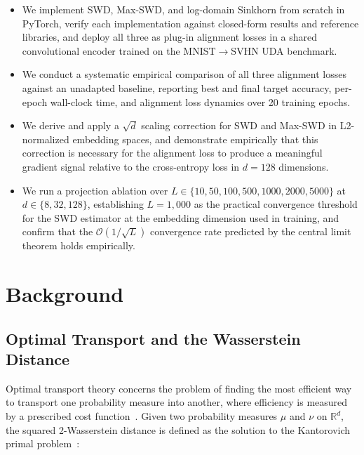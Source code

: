 \documentclass{article}
\begin{document}
	\begin{itemize}
		\item We implement SWD, Max-SWD, and log-domain Sinkhorn from scratch in PyTorch, verify each implementation against closed-form results and reference libraries, and deploy all three as plug-in alignment losses in a shared convolutional encoder trained on the MNIST$\to$SVHN UDA benchmark.
		
		\item We conduct a systematic empirical comparison of all three alignment losses against an unadapted baseline, reporting best and final target accuracy, per-epoch wall-clock time, and alignment loss dynamics over 20 training epochs.
		
		\item We derive and apply a $\sqrt{d}$ scaling correction for SWD and Max-SWD in L2-normalized embedding spaces, and demonstrate empirically that this correction is necessary for the alignment loss to produce a meaningful gradient signal relative to the cross-entropy loss in $d = 128$ dimensions.
		
		\item We run a projection ablation over $L \in \{10, 50, 100, 500, 1000, 2000, 5000\}$ at $d \in \{8, 32, 128\}$, establishing $L = 1{,}000$ as the practical convergence threshold for the SWD estimator at the embedding dimension used in training, and confirm that the $\mathcal{O}(1/\sqrt{L})$ convergence rate predicted by the central limit theorem holds empirically.
	\end{itemize}
	
	
	
	
	
	\section{Background}
	
	\subsection{Optimal Transport and the Wasserstein Distance}
	
	Optimal transport theory concerns the problem of finding the most efficient way to transport one probability measure into another, where efficiency is measured by a prescribed cost function~\citep{fernandes}. Given two probability measures $\mu$ and $\nu$ on $\mathbb{R}^d$, the squared 2-Wasserstein distance is defined as the solution to the Kantorovich primal problem~\citep{martin}:
	
\end{document}
